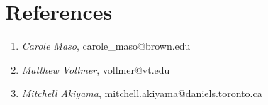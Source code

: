     \section{References}


    \begin{enumerate}
    
    \item \emph{Carole Maso}, carole\_maso@brown.edu \\
    \item \emph{Matthew Vollmer}, vollmer@vt.edu\\
     \item \emph{Mitchell Akiyama},  mitchell.akiyama@daniels.toronto.ca\\
 
 
 \end{enumerate}
